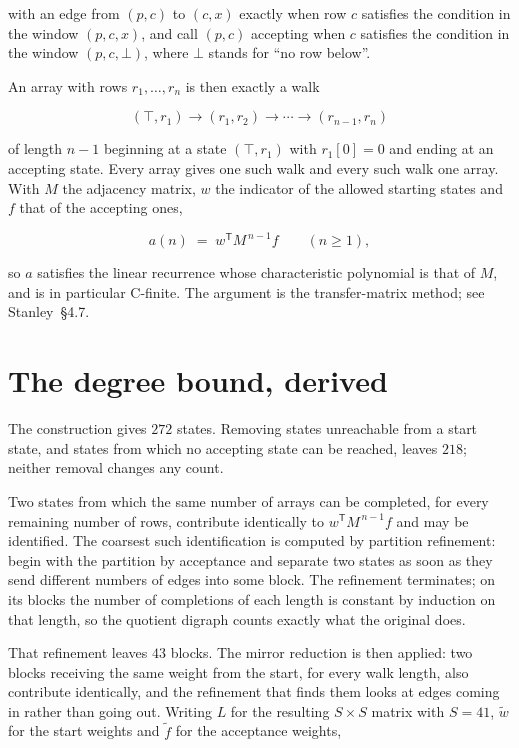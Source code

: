 \documentclass[11pt]{article}
\theoremstyle{definition}
\begin{document}
with an edge from $(p,c)$ to $(c,x)$ exactly when row $c$ satisfies the condition in the window $(p,c,x)$, and call $(p,c)$ accepting when $c$ satisfies the condition in the window $(p,c,\bot)$, where $\bot$ stands for ``no row below''.

An array with rows $r_1,\dots,r_n$ is then exactly a walk

\[(\top,r_1) \to (r_1,r_2) \to \cdots \to (r_{n-1},r_n)\]

of length $n-1$ beginning at a state $(\top,r_1)$ with $r_1[0]=0$ and ending at an accepting state. Every array gives one such walk and every such walk one array. With $M$ the adjacency matrix, $w$ the indicator of the allowed starting states and $f$ that of the accepting ones,

\[a(n) \;=\; w^{\mathsf T} M^{\,n-1} f \qquad (n \ge 1),\]

so $a$ satisfies the linear recurrence whose characteristic polynomial is that of $M$, and is in particular C-finite. The argument is the transfer-matrix method; see Stanley~\S4.7.

\section{The degree bound, derived}

The construction gives $272$ states. Removing states unreachable from a start state, and states from which no accepting state can be reached, leaves $218$; neither removal changes any count.

Two states from which the same number of arrays can be completed, for every remaining number of rows, contribute identically to $w^{\mathsf T}M^{\,n-1}f$ and may be identified. The coarsest such identification is computed by partition refinement: begin with the partition by acceptance and separate two states as soon as they send different numbers of edges into some block. The refinement terminates; on its blocks the number of completions of each length is constant by induction on that length, so the quotient digraph counts exactly what the original does.

That refinement leaves $43$ blocks. The mirror reduction is then applied: two blocks receiving the same weight from the start, for every walk length, also contribute identically, and the refinement that finds them looks at edges coming in rather than going out. Writing $L$ for the resulting $S \times S$ matrix with $S = 41$, $\tilde w$ for the start weights and $\tilde f$ for the acceptance weights,
\end{document}
